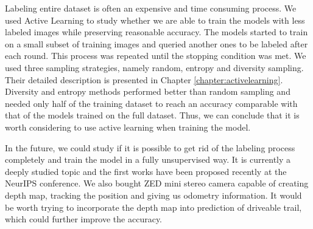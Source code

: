 Labeling entire dataset is often an expensive and time consuming process.
We used Active Learning to study whether we are able to train
the models with less labeled images while preserving reasonable accuracy. The models started
to train on a small subset of training images and queried another ones to be labeled after
each round.
This process was repeated until the stopping condition was met. We used three sampling
strategies, namely random, entropy and diversity sampling. Their detailed description is
presented in Chapter \ref{chapter:activelearning}. Diversity and entropy methods performed
better than random sampling and needed only half of the training dataset to reach an accuracy
comparable with that of the models trained on the full dataset.
Thus, we can conclude that it is worth considering to use active learning when
training the model.

In the future, we could study if it is possible to get rid of the labeling process completely
and train the model in a fully unsupervised way. It is currently a deeply studied topic and
the first works 
\cite{bib:chen2019unsupervised, bib:nguyen2019deepusps, bib:bielski2019emergence}
have been proposed recently at the NeurIPS conference.
We also bought ZED mini stereo camera capable of creating depth map, tracking the position and
giving us odometry information. It would be worth trying to incorporate the depth map
into prediction of driveable trail, which could further improve the accuracy.
